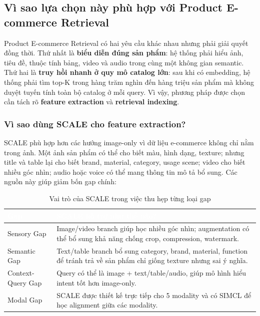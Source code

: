 \documentclass[12pt,a4paper]{article}
\begin{document}
\subsection{Vì sao lựa chọn này phù hợp với Product E-commerce Retrieval}
Product E-commerce Retrieval có hai yêu cầu khác nhau nhưng phải giải quyết đồng thời. Thứ nhất là \textbf{biểu diễn đúng sản phẩm}: hệ thống phải hiểu ảnh, tiêu đề, thuộc tính bảng, video và audio trong cùng một không gian semantic. Thứ hai là \textbf{truy hồi nhanh ở quy mô catalog lớn}: sau khi có embedding, hệ thống phải tìm top-K trong hàng trăm nghìn đến hàng triệu sản phẩm mà không duyệt tuyến tính toàn bộ catalog ở mỗi query. Vì vậy, phương pháp được chọn cần tách rõ \textbf{feature extraction} và \textbf{retrieval indexing}.

\subsubsection{Vì sao dùng SCALE cho feature extraction?}
SCALE phù hợp hơn các hướng image-only vì dữ liệu e-commerce không chỉ nằm trong ảnh. Một ảnh sản phẩm có thể cho biết màu, hình dạng, texture; nhưng title và table lại cho biết brand, material, category, usage scene; video cho biết nhiều góc nhìn; audio hoặc voice có thể mang thông tin mô tả bổ sung. Các nguồn này giúp giảm bốn gap chính:

\begin{table}[htbp]
\centering
\begin{tabularx}{\linewidth}{@{}L{2.6cm}Y@{}}
\toprule
{}
\textcolor{white}{\textbf{Gap}} & \textcolor{white}{\textbf{SCALE hỗ trợ như thế nào?}} \\
\midrule
Sensory Gap & Image/video branch giúp học nhiều góc nhìn; augmentation có thể bổ sung khả năng chống crop, compression, watermark. \\
Semantic Gap & Text/table branch bổ sung category, brand, material, function để tránh trả về sản phẩm chỉ giống texture nhưng sai ý nghĩa. \\
Context-Query Gap & Query có thể là image + text/table/audio, giúp mô hình hiểu intent tốt hơn image-only. \\
Modal Gap & SCALE được thiết kế trực tiếp cho 5 modality và có SIMCL để học alignment giữa các modality. \\
\bottomrule
\end{tabularx}
\caption{Vai trò của SCALE trong việc thu hẹp từng loại gap}
\end{table}
\end{document}
